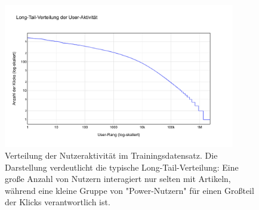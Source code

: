 
\begin{figure}[htbp]
    \centering
    \includegraphics[width=0.9\textwidth]{content/figures/svg/nutzer_verteilung_train.pdf}
    \caption{Verteilung der Nutzeraktivität im Trainingsdatensatz. Die Darstellung verdeutlicht die typische Long-Tail-Verteilung: Eine große Anzahl von Nutzern interagiert nur selten mit Artikeln, während eine kleine Gruppe von "Power-Nutzern" für einen Großteil der Klicks verantwortlich ist.}
    \label{fig:nutzerverteilung_train}
\end{figure}